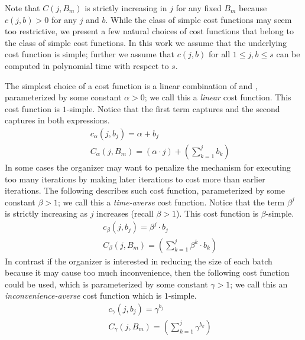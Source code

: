 Note that $C(j, B_{m})$ is strictly increasing in $j$ for any fixed $B_{m}$ because $c(j, b) > 0$ for any $j$ and $b$. While the class of simple cost functions may seem too restrictive, we present a few natural choices of cost functions that belong to the class of simple cost functions. In this work we assume that the underlying cost function is simple; further we assume that $c(j, b)$ for all $1 \leq j, b \leq s$ can be computed in polynomial time with respect to $s$.
\begin{example} \label{bdoodle:exmp:CostFunctions}
	The simplest choice of a cost function is a linear combination of \Times and \Inconvenience, parameterized by some constant $\alpha > 0$; we call this a \emph{linear} cost function. This cost function is $1$-simple. Notice that the first term captures \Times and the second captures \Inconveniences in both expressions.
	\begin{eqnarray*} \label{bdoodle:eqn:linear_cost_function}
	&&	c_{\alpha}(j, b_j) = \alpha + b_j \\
	&&	C_{\alpha}(j, {B}_m) = \left(\alpha \cdot j\right) + \left(\sum_{k=1}^{j} b_k\right)
	\end{eqnarray*}
	In some cases the organizer may want to penalize the mechanism for executing too many iterations by making later iterations to cost more than earlier iterations. The following describes such cost function, parameterized by some constant $\beta > 1$; we call this a \emph{time-averse} cost function. Notice that the term $\beta^j$ is strictly increasing as $j$ increases (recall $\beta > 1$). This cost function is $\beta$-simple.
	\begin{eqnarray*} \label{bdoodle:eqn:time_averse_cost_function}
	&&	c_{\beta}(j, b_j) = \beta^j \cdot b_j \\
	&&	C_{\beta}(j, {B}_m) = \left(\sum_{k=1}^{j} \beta^k \cdot b_k \right)
	\end{eqnarray*}
	In contrast if the organizer is interested in reducing the size of each batch because it may cause too much inconvenience, then the following cost function could be used, which is parameterized by some constant $\gamma > 1$; we call this an \emph{inconvenience-averse} cost function which is $1$-simple.
	\begin{eqnarray*} \label{bdoodle:eqn:inconvenience_averse_cost_function}
	&&	c_{\gamma}(j, b_j) = \gamma^{b_j} \\
	&&	C_{\gamma}(j, {B}_m) = \left(\sum_{k=1}^{j} \gamma^{b_k} \right)
	\end{eqnarray*}
\end{example}


